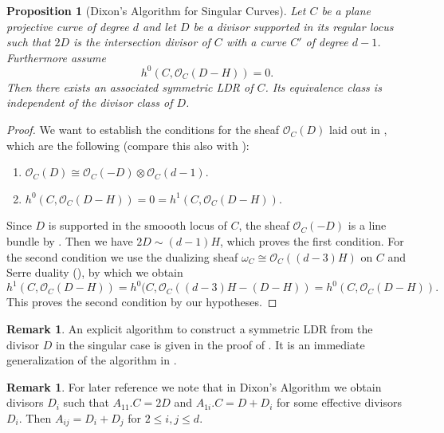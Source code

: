 \documentclass[a4paper,10pt]{amsart}
\theoremstyle{definition}
\newtheorem{rem}[defin]{Remark}
\theoremstyle{plain}
\newtheorem{prop}[defin]{Proposition}
\newcommand{\cO}{{\mathcal O}}
\begin{document}
\begin{prop}[Dixon's Algorithm for Singular Curves] \label{prop:singDixon}
 Let $C$ be a plane projective curve of degree $d$ and let $D$ be a divisor supported in its regular locus such that $2D$ is the intersection divisor of $C$ with a curve $C'$ of degree $d-1$. Furthermore assume
 \begin{equation*}
     h^0(C, \cO_C(D-H)) = 0.
 \end{equation*}
 Then there exists an associated symmetric LDR of $C$. Its equivalence class is independent of the divisor class of $D$.
\end{prop}

\begin{proof}
 We want to establish the conditions for the sheaf $\cO_C(D)$ laid out in \cite[Proposition 5.4]{KernerVinnikov2012singularDetRep}, which are the following (compare this also with \cite[Proposition 1.11, Theorem B]{Beauville2000DetHypSurf}):
 \begin{enumerate}
     \item $\cO_C(D) \cong \cO_C(-D) \otimes \cO_C(d-1)$.
     \item $h^0(C, \cO_C(D-H)) = 0 = h^1(C, \cO_C(D-H))$.
 \end{enumerate}
 Since $D$ is supported in the smoooth locus of $C$, the sheaf $\cO_C(-D)$ is a line bundle by \cite[Proposition 6.13.(a)]{Hartshorne1977AG}. Then we have $2D \sim (d-1)H$, which proves the first condition. For the second condition we use the dualizing sheaf $\omega_C \cong \cO_C((d-3)H)$ on $C$ and Serre duality (\cite[\S2.1.3]{KernerVinnikov2012singularDetRep}), by which we obtain
 \begin{equation*}
     h^1(C, \cO_C(D - H)) = h^0(C, \cO_C((d-3)H-(D-H)) = h^0(C, \cO_C(D-H)).
 \end{equation*}
 This proves the second condition by our hypotheses.
\end{proof}

\begin{rem}
 An explicit algorithm to construct a symmetric LDR from the divisor $D$ in the singular case is given in the proof of \cite[Theorem 4.3]{KernerVinnikov2012singularDetRep}. It is an immediate generalization of the algorithm in .
\end{rem}


\begin{rem} \label{rem:DixonVanishing}
 For later reference we note that in Dixon's Algorithm we obtain divisors $D_i$ such that $A_{11}.C = 2D$ and $A_{1i}.C = D+D_i$ for some effective divisors $D_i$. Then $A_{ij} = D_i + D_j$ for $2 \leq i,j \leq d$.
\end{rem}
\end{document}
